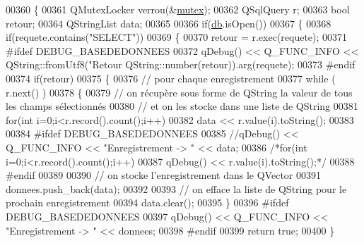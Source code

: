 \begin{DoxyCode}
00360 \{
00361     QMutexLocker verrou(&\hyperlink{class_base_de_donnees_aa1b4696fac87a740f914aa73739086f2}{mutex});
00362     QSqlQuery r;
00363     \textcolor{keywordtype}{bool} retour;
00364     QStringList data;
00365 
00366     \textcolor{keywordflow}{if}(\hyperlink{class_base_de_donnees_a3e738dcf443370c46a541677ab619f06}{db}.isOpen())
00367     \{
00368         \textcolor{keywordflow}{if}(requete.contains(\textcolor{stringliteral}{"SELECT"}))
00369         \{
00370             retour = r.exec(requete);
00371 \textcolor{preprocessor}{            #ifdef DEBUG\_BASEDEDONNEES}
00372             qDebug() << Q\_FUNC\_INFO << QString::fromUtf8(\textcolor{stringliteral}{"Retour %
      QString::number(retour)).arg(requete);
00373 \textcolor{preprocessor}{            #endif}
00374             \textcolor{keywordflow}{if}(retour)
00375             \{
00376                 \textcolor{comment}{// pour chaque enregistrement}
00377                 \textcolor{keywordflow}{while} ( r.next() )
00378                 \{
00379                     \textcolor{comment}{// on récupère sous forme de QString la valeur de tous les champs sélectionnés}
00380                     \textcolor{comment}{// et on les stocke dans une liste de QString}
00381                     \textcolor{keywordflow}{for}(\textcolor{keywordtype}{int} i=0;i<r.record().count();i++)
00382                         data << r.value(i).toString();
00383 
00384 \textcolor{preprocessor}{                    #ifdef DEBUG\_BASEDEDONNEES}
00385                     \textcolor{comment}{//qDebug() << Q\_FUNC\_INFO << "Enregistrement -> " << data;}
00386                     \textcolor{comment}{/*for(int i=0;i<r.record().count();i++)}
00387 \textcolor{comment}{                        qDebug() << r.value(i).toString();*/}
00388 \textcolor{preprocessor}{                    #endif}
00389 
00390                     \textcolor{comment}{// on stocke l'enregistrement dans le QVector}
00391                     donnees.push\_back(data);
00392 
00393                     \textcolor{comment}{// on efface la liste de QString pour le prochain enregistrement}
00394                     data.clear();
00395                 \}
00396 \textcolor{preprocessor}{                #ifdef DEBUG\_BASEDEDONNEES}
00397                 qDebug() << Q\_FUNC\_INFO << \textcolor{stringliteral}{"Enregistrement -> "} << donnees;
00398 \textcolor{preprocessor}{                #endif}
00399                 \textcolor{keywordflow}{return} \textcolor{keyword}{true};
00400             \}
}
\end{DoxyCode}
